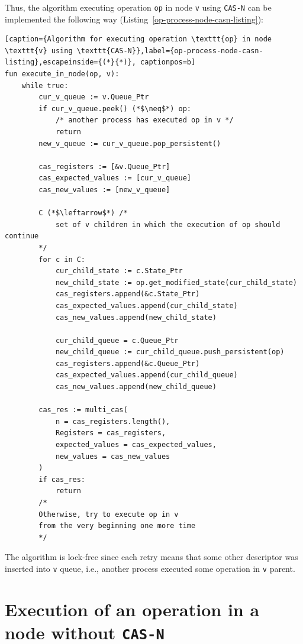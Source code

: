 \documentclass[times, dvipsnames,%
               languages={russian,english} %
              ]{itmo-student-thesis}
\begin{document}
Thus, the algorithm executing operation \texttt{op} in node \texttt{v} using \texttt{CAS-N} can be implemented the following way (Listing~\ref{op-process-node-casn-listing}):

\renewcommand{\lstlistingname}{Listing}
\begin{lstlisting}[caption={Algorithm for executing operation \texttt{op} in node \texttt{v} using \texttt{CAS-N}},label={op-process-node-casn-listing},escapeinside={(*}{*)}, captionpos=b]
fun execute_in_node(op, v):
    while true:
        cur_v_queue := v.Queue_Ptr
        if cur_v_queue.peek() (*$\neq$*) op:
            /* another process has executed op in v */
            return
        new_v_queue := cur_v_queue.pop_persistent()
        
        cas_registers := [&v.Queue_Ptr]
        cas_expected_values := [cur_v_queue]
        cas_new_values := [new_v_queue]
    
        C (*$\leftarrow$*) /* 
            set of v children in which the execution of op should continue 
        */
        for c in C:
            cur_child_state := c.State_Ptr
            new_child_state := op.get_modified_state(cur_child_state)
            cas_registers.append(&c.State_Ptr)
            cas_expected_values.append(cur_child_state)
            cas_new_values.append(new_child_state)
        
            cur_child_queue = c.Queue_Ptr
            new_child_queue := cur_child_queue.push_persistent(op)
            cas_registers.append(&c.Queue_Ptr)
            cas_expected_values.append(cur_child_queue)
            cas_new_values.append(new_child_queue)
        
        cas_res := multi_cas(
            n = cas_registers.length(), 
            Registers = cas_registers,
            expected_values = cas_expected_values, 
            new_values = cas_new_values
        )
        if cas_res:
            return
        /* 
        Otherwise, try to execute op in v 
        from the very beginning one more time 
        */
\end{lstlisting}

The algorithm is lock-free since each retry means that some other descriptor was inserted into \texttt{v} queue, i.e., another process executed some operation in \texttt{v} parent.

\section{Execution of an operation in a node without \texttt{CAS-N}}
\label{no-casn-chapter}
\end{document}
